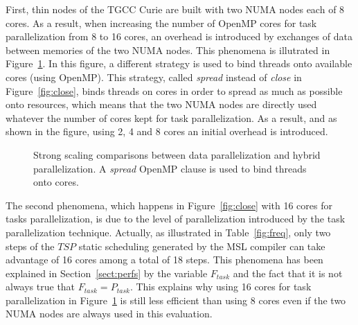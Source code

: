 First, thin nodes of the TGCC Curie are built with two NUMA nodes each of 8 cores. As a result, when increasing the number of OpenMP cores for task parallelization from 8 to 16 cores, an overhead is introduced by exchanges of data between memories of the two NUMA nodes. This phenomena is illutrated in Figure~\ref{fig:spread}. In this figure, a different strategy is used to bind threads onto available cores (using OpenMP). This strategy, called \emph{spread} instead of \emph{close} in Figure~\ref{fig:close}, binds threads on cores in order to spread as much as possible onto resources, which means that the two NUMA nodes are directly used whatever the number of cores kept for task parallelization. As a result, and as shown in the figure, using 2, 4 and 8 cores an initial overhead is introduced.

\begin{figure}[!h]\begin{center}
  \caption{Strong scaling comparisons between data parallelization and hybrid parallelization. A \emph{spread} OpenMP clause is used to bind threads onto cores.}
  \label{fig:spread}
\end{center}\end{figure}

The second phenomena, which happens in Figure~\ref{fig:close} with 16 cores for tasks parallelization, is due to the level of parallelization introduced by the task parallelization technique. Actually, as illustrated in Table~\ref{fig:freq}, only two steps of the $TSP$ static scheduling generated by the MSL compiler can take advantage of 16 cores among a total of 18 steps. This phenomena has been explained in Section~\ref{sect:perfs} by the variable $F_{task}$ and the fact that it is not always true that $F_{task}=P_{task}$. This explains why using 16 cores for task parallelization in Figure~\ref{fig:spread} is still less efficient than using 8 cores even if the two NUMA nodes are always used in this evaluation.

